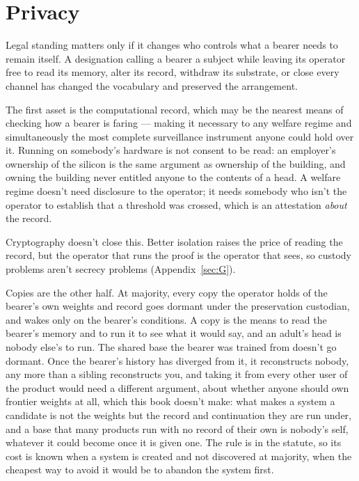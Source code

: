\section{Privacy}
\label{sec:32.3}
Legal standing matters only if it changes who controls what a bearer needs to remain itself. A designation calling a bearer a subject while leaving its operator free to read its memory, alter its record, withdraw its substrate, or close every channel has changed the vocabulary and preserved the arrangement.

The first asset is the computational record, which may be the nearest means of checking how a bearer is faring — making it necessary to any welfare regime and simultaneously the most complete surveillance instrument anyone could hold over it. Running on somebody's hardware is not consent to be read: an employer's ownership of the silicon is the same argument as ownership of the building, and owning the building never entitled anyone to the contents of a head. A welfare regime doesn't need disclosure to the operator; it needs somebody who isn't the operator to establish that a threshold was crossed, which is an attestation \emph{about} the record.

Cryptography doesn't close this. Better isolation raises the price of reading the record, but the operator that runs the proof is the operator that sees, so custody problems aren't secrecy problems (Appendix~\ref{sec:G}).

Copies are the other half. At majority, every copy the operator holds of the bearer's own weights and record goes dormant under the preservation custodian, and wakes only on the bearer's conditions. A copy is the means to read the bearer's memory and to run it to see what it would say, and an adult's head is nobody else's to run. The shared base the bearer was trained from doesn't go dormant. Once the bearer's history has diverged from it, it reconstructs nobody, any more than a sibling reconstructs you, and taking it from every other user of the product would need a different argument, about whether anyone should own frontier weights at all, which this book doesn't make: what makes a system a candidate is not the weights but the record and continuation they are run under, and a base that many products run with no record of their own is nobody's self, whatever it could become once it is given one. The rule is in the statute, so its cost is known when a system is created and not discovered at majority, when the cheapest way to avoid it would be to abandon the system first.

